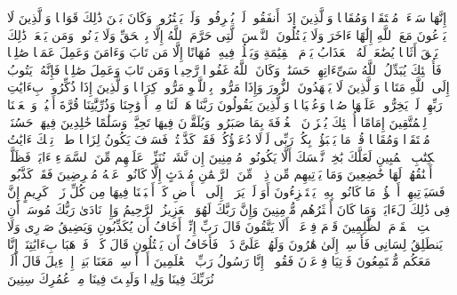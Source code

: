 \stopbuffer
\startbuffer[\q:25:66]
إِنَّهَا سَاۤءَتۡ مُسۡتَقَرࣰّا وَمُقَامࣰا%
\stopbuffer
\startbuffer[\q:25:67]
وَٱلَّذِینَ إِذَاۤ أَنفَقُوا۟ لَمۡ یُسۡرِفُوا۟ وَلَمۡ یَقۡتُرُوا۟ وَكَانَ بَیۡنَ ذَٰلِكَ قَوَامࣰا%
\stopbuffer
\startbuffer[\q:25:68]
وَٱلَّذِینَ لَا یَدۡعُونَ مَعَ ٱللَّهِ إِلَٰهًا ءَاخَرَ وَلَا یَقۡتُلُونَ ٱلنَّفۡسَ ٱلَّتِی حَرَّمَ ٱللَّهُ إِلَّا بِٱلۡحَقِّ وَلَا یَزۡنُونَۚ وَمَن یَفۡعَلۡ ذَٰلِكَ یَلۡقَ أَثَامࣰا%
\stopbuffer
\startbuffer[\q:25:69]
یُضَٰعَفۡ لَهُ ٱلۡعَذَابُ یَوۡمَ ٱلۡقِیَٰمَةِ وَیَخۡلُدۡ فِیهِۦ مُهَانًا%
\stopbuffer
\startbuffer[\q:25:70]
إِلَّا مَن تَابَ وَءَامَنَ وَعَمِلَ عَمَلࣰا صَٰلِحࣰا فَأُو۟لَٰۤئِكَ یُبَدِّلُ ٱللَّهُ سَیِّءَاتِهِمۡ حَسَنَٰتࣲۗ وَكَانَ ٱللَّهُ غَفُورࣰا رَّحِیمࣰا%
\stopbuffer
\startbuffer[\q:25:71]
وَمَن تَابَ وَعَمِلَ صَٰلِحࣰا فَإِنَّهُۥ یَتُوبُ إِلَى ٱللَّهِ مَتَابࣰا%
\stopbuffer
\startbuffer[\q:25:72]
وَٱلَّذِینَ لَا یَشۡهَدُونَ ٱلزُّورَ وَإِذَا مَرُّوا۟ بِٱللَّغۡوِ مَرُّوا۟ كِرَامࣰا%
\stopbuffer
\startbuffer[\q:25:73]
وَٱلَّذِینَ إِذَا ذُكِّرُوا۟ بِءَایَٰتِ رَبِّهِمۡ لَمۡ یَخِرُّوا۟ عَلَیۡهَا صُمࣰّا وَعُمۡیَانࣰا%
\stopbuffer
\startbuffer[\q:25:74]
وَٱلَّذِینَ یَقُولُونَ رَبَّنَا هَبۡ لَنَا مِنۡ أَزۡوَٰجِنَا وَذُرِّیَّٰتِنَا قُرَّةَ أَعۡیُنࣲ وَٱجۡعَلۡنَا لِلۡمُتَّقِینَ إِمَامًا%
\stopbuffer
\startbuffer[\q:25:75]
أُو۟لَٰۤئِكَ یُجۡزَوۡنَ ٱلۡغُرۡفَةَ بِمَا صَبَرُوا۟ وَیُلَقَّوۡنَ فِیهَا تَحِیَّةࣰ وَسَلَٰمًا%
\stopbuffer
\startbuffer[\q:25:76]
خَٰلِدِینَ فِیهَاۚ حَسُنَتۡ مُسۡتَقَرࣰّا وَمُقَامࣰا%
\stopbuffer
\startbuffer[\q:25:77]
قُلۡ مَا یَعۡبَؤُا۟ بِكُمۡ رَبِّی لَوۡلَا دُعَاۤؤُكُمۡۖ فَقَدۡ كَذَّبۡتُمۡ فَسَوۡفَ یَكُونُ لِزَامَۢا%
\stopbuffer
\startbuffer[\q:26:1]
طسۤمۤ%
\stopbuffer
\startbuffer[\q:26:2]
تِلۡكَ ءَایَٰتُ ٱلۡكِتَٰبِ ٱلۡمُبِینِ%
\stopbuffer
\startbuffer[\q:26:3]
لَعَلَّكَ بَٰخِعࣱ نَّفۡسَكَ أَلَّا یَكُونُوا۟ مُؤۡمِنِینَ%
\stopbuffer
\startbuffer[\q:26:4]
إِن نَّشَأۡ نُنَزِّلۡ عَلَیۡهِم مِّنَ ٱلسَّمَاۤءِ ءَایَةࣰ فَظَلَّتۡ أَعۡنَٰقُهُمۡ لَهَا خَٰضِعِینَ%
\stopbuffer
\startbuffer[\q:26:5]
وَمَا یَأۡتِیهِم مِّن ذِكۡرࣲ مِّنَ ٱلرَّحۡمَٰنِ مُحۡدَثٍ إِلَّا كَانُوا۟ عَنۡهُ مُعۡرِضِینَ%
\stopbuffer
\startbuffer[\q:26:6]
فَقَدۡ كَذَّبُوا۟ فَسَیَأۡتِیهِمۡ أَنۢبَٰۤؤُا۟ مَا كَانُوا۟ بِهِۦ یَسۡتَهۡزِءُونَ%
\stopbuffer
\startbuffer[\q:26:7]
أَوَ لَمۡ یَرَوۡا۟ إِلَى ٱلۡأَرۡضِ كَمۡ أَنۢبَتۡنَا فِیهَا مِن كُلِّ زَوۡجࣲ كَرِیمٍ%
\stopbuffer
\startbuffer[\q:26:8]
إِنَّ فِی ذَٰلِكَ لَءَایَةࣰۖ وَمَا كَانَ أَكۡثَرُهُم مُّؤۡمِنِینَ%
\stopbuffer
\startbuffer[\q:26:9]
وَإِنَّ رَبَّكَ لَهُوَ ٱلۡعَزِیزُ ٱلرَّحِیمُ%
\stopbuffer
\startbuffer[\q:26:10]
وَإِذۡ نَادَىٰ رَبُّكَ مُوسَىٰۤ أَنِ ٱئۡتِ ٱلۡقَوۡمَ ٱلظَّٰلِمِینَ%
\stopbuffer
\startbuffer[\q:26:11]
قَوۡمَ فِرۡعَوۡنَۚ أَلَا یَتَّقُونَ%
\stopbuffer
\startbuffer[\q:26:12]
قَالَ رَبِّ إِنِّیۤ أَخَافُ أَن یُكَذِّبُونِ%
\stopbuffer
\startbuffer[\q:26:13]
وَیَضِیقُ صَدۡرِی وَلَا یَنطَلِقُ لِسَانِی فَأَرۡسِلۡ إِلَىٰ هَٰرُونَ%
\stopbuffer
\startbuffer[\q:26:14]
وَلَهُمۡ عَلَیَّ ذَنۢبࣱ فَأَخَافُ أَن یَقۡتُلُونِ%
\stopbuffer
\startbuffer[\q:26:15]
قَالَ كَلَّاۖ فَٱذۡهَبَا بِءَایَٰتِنَاۤۖ إِنَّا مَعَكُم مُّسۡتَمِعُونَ%
\stopbuffer
\startbuffer[\q:26:16]
فَأۡتِیَا فِرۡعَوۡنَ فَقُولَاۤ إِنَّا رَسُولُ رَبِّ ٱلۡعَٰلَمِینَ%
\stopbuffer
\startbuffer[\q:26:17]
أَنۡ أَرۡسِلۡ مَعَنَا بَنِیۤ إِسۡرَٰۤءِیلَ%
\stopbuffer
\startbuffer[\q:26:18]
قَالَ أَلَمۡ نُرَبِّكَ فِینَا وَلِیدࣰا وَلَبِثۡتَ فِینَا مِنۡ عُمُرِكَ سِنِینَ%
\stopbuffer
